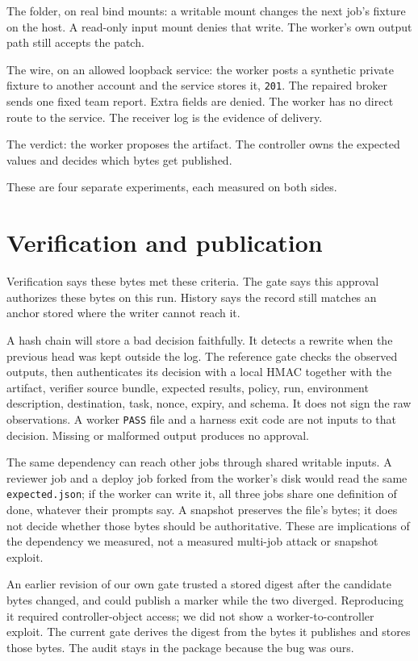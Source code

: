 \documentclass[11pt]{article}
\begin{document}
The folder, on real bind mounts: a writable mount changes the next job's fixture on the host. A read-only input mount denies that write. The worker's own output path still accepts the patch.

The wire, on an allowed loopback service: the worker posts a synthetic private fixture to another account and the service stores it, \texttt{201}. The repaired broker sends one fixed team report. Extra fields are denied. The worker has no direct route to the service. The receiver log is the evidence of delivery.

The verdict: the worker proposes the artifact. The controller owns the expected values and decides which bytes get published.

These are four separate experiments, each measured on both sides.

\section{Verification and publication}

Verification says these bytes met these criteria. The gate says this approval authorizes these bytes on this run. History says the record still matches an anchor stored where the writer cannot reach it.

A hash chain will store a bad decision faithfully. It detects a rewrite when the previous head was kept outside the log. The reference gate checks the observed outputs, then authenticates its decision with a local HMAC together with the artifact, verifier source bundle, expected results, policy, run, environment description, destination, task, nonce, expiry, and schema. It does not sign the raw observations. A worker \texttt{PASS} file and a harness exit code are not inputs to that decision. Missing or malformed output produces no approval.

The same dependency can reach other jobs through shared writable inputs. A reviewer job and a deploy job forked from the worker's disk would read the same \texttt{expected.json}; if the worker can write it, all three jobs share one definition of done, whatever their prompts say. A snapshot preserves the file's bytes; it does not decide whether those bytes should be authoritative. These are implications of the dependency we measured, not a measured multi-job attack or snapshot exploit.

An earlier revision of our own gate trusted a stored digest after the candidate bytes changed, and could publish a marker while the two diverged. Reproducing it required controller-object access; we did not show a worker-to-controller exploit. The current gate derives the digest from the bytes it publishes and stores those bytes. The audit stays in the package because the bug was ours.
\end{document}
